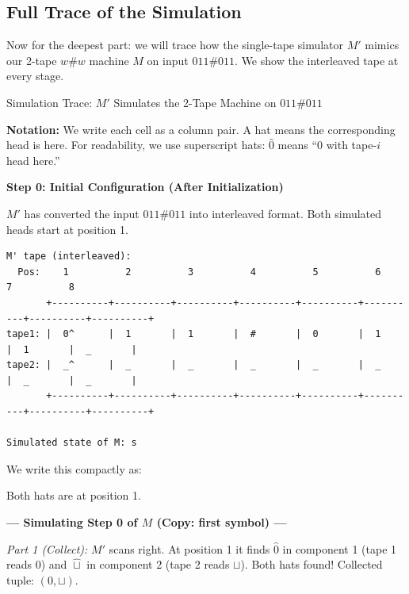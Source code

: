 \subsection{Full Trace of the Simulation}

Now for the deepest part: we will trace how the single-tape simulator $M'$ mimics our 2-tape $w\#w$ machine $M$ on input $011\#011$. We show the interleaved tape at every stage.

\begin{examplebox}{{Simulation Trace: $M'$ Simulates the 2-Tape Machine on $011\#011$}}

\textbf{Notation:} We write each cell as a column pair. A hat means the corresponding head is here. For readability, we use superscript hats: $\hat{0}$ means ``0 with tape-$i$ head here.''

\textbf{Step 0: Initial Configuration (After Initialization)}

$M'$ has converted the input $011\#011$ into interleaved format. Both simulated heads start at position 1.

\begin{lstlisting}
M' tape (interleaved):
  Pos:    1          2          3          4          5          6          7          8
       +----------+----------+----------+----------+----------+----------+----------+----------+
tape1: |  0^      |  1       |  1       |  #       |  0       |  1       |  1       |  _       |
tape2: |  _^      |  _       |  _       |  _       |  _       |  _       |  _       |  _       |
       +----------+----------+----------+----------+----------+----------+----------+----------+

Simulated state of M: s
\end{lstlisting}

We write this compactly as:


Both hats are at position 1.

\bigskip
\textbf{--- Simulating Step 0 of $M$ (Copy: first symbol) ---}

\textit{Part 1 (Collect):} $M'$ scans right. At position 1 it finds $\hat{0}$ in component 1 (tape 1 reads 0) and $\hat{\sqcup}$ in component 2 (tape 2 reads $\sqcup$). Both hats found! Collected tuple: $(0, \sqcup)$.


\end{examplebox}
